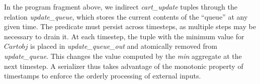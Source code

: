 In the program fragment above, we indirect {\em cart\_update} tuples through the relation
{\em update\_queue}, which stores the current contents of the ``queue''  at 
any given time.  The predicate must persist across timesteps, as multiple steps may be
necessary to drain it.  At each timestep, the tuple with the minimum value for $Cartobj$
is placed in {\em update\_queue\_out} and atomically removed from {\em update\_queue}.
This changes the value computed by the {\em min} aggregate at the next timestep.
A serializer thus takes advantage of the monotonic property of timestamps to enforce the
orderly processing of external inputs.


\begin{comment}
\subsubsection{Priority Queues}

\paa{whack this ponderous subsection.  present instead \emph{serializers},
which do what so-called queues below do: enforce 'associativity' by preventing
more that one tuple from being considered per fixpoint.  then present
\emph{ordered queues} (or perhaps the same thing with a better name)
after the discussion of sequences (since OQs use sequences), as a mechanism
for maintaining ordering across async boundaries (familiar from TCP, fifo broadcast,
etc)}

In the program below, \dedalus{priority\_queue} stores the current contents of
the queue at any given time.  The queue must persist across timesteps, as
multiple timesteps may be necessary to drain the queue.  At each timestep, for
each value of \dedalus{A}, all tuples of minimum priority are stored in
\dedalus{priority\_queue\_out} and deleted (atomic with the storage).  Note
that this will change the value of the aggregate calculated at the subsequent
timestamp, assuming no new tuples are inserted at the next timestamp with a
just-dequeued priority:

\begin{Dedalus}
persist[priority\_queue, 3]

// find the min priorities
omin(A, min<C>) \(\leftarrow\)
  priority\_queue(A, _, C);

// output min priority elements
priority_queue_out(A, B, C)@next \(\leftarrow\)
  priority\_queue(A, B, C), omin(A, C);

// delete min priority elements
delete priority\_queue(A, B, C) \(\leftarrow\)
  priority\_queue(A, B, C), omin(A, C);
\end{Dedalus}


\end{comment}
